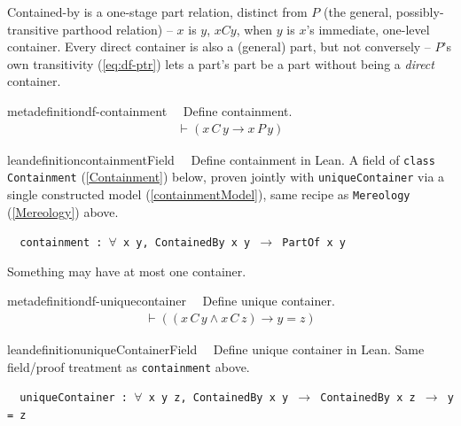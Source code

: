 \pn Contained-by is a one-stage part relation, distinct from $P$ (the general, possibly-transitive
parthood relation) -- $x$ is  $y$, $xCy$, when $y$ is $x$'s immediate, one-level
container. Every direct container is also a (general) part, but not conversely -- $P$'s own transitivity
(\ref{eq:df-ptr}) lets a part's part be a part without being a \emph{direct} container.
\begin{restatable}{metadefinition}{df-containment}~~ Define containment.
\begin{align}
\vdash ( x \,C \,y \rightarrow x \,P \,y )\label{eq:df-containment}\tag{df-containment}
\end{align}
\end{restatable}

\begin{restatable}{leandefinition}{containmentField}~~ Define containment in Lean. A
field of \texttt{class Containment} (\ref{Containment}) below, proven jointly with \texttt{uniqueContainer}
via a single constructed model (\ref{containmentModel}), same recipe as \texttt{Mereology} (\ref{Mereology})
above.

\texttt{~~containment : $\forall$ x y, ContainedBy x y $\to$ PartOf x y}
\label{containmentField}
\end{restatable}

\pn Something may have at most one container.
\begin{restatable}{metadefinition}{df-uniquecontainer}~~ Define unique container.
\begin{align}
\vdash ( ( x \,C \,y \wedge x \,C \,z ) \rightarrow y = z )\label{eq:df-uniquecontainer}\tag{df-uniquecontainer}
\end{align}
\end{restatable}

\begin{restatable}{leandefinition}{uniqueContainerField}~~ Define unique container
in Lean. Same field/proof treatment as \texttt{containment} above.

\texttt{~~uniqueContainer : $\forall$ x y z, ContainedBy x y $\to$ ContainedBy x z $\to$ y = z}
\label{uniqueContainerField}
\end{restatable}


